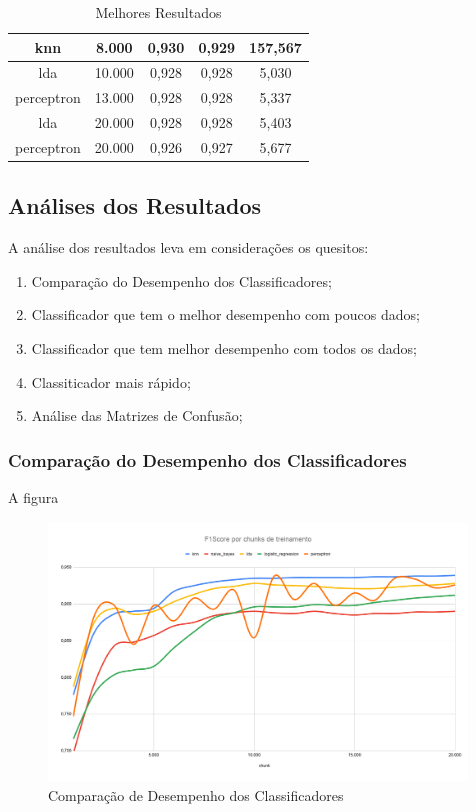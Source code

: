 \documentclass[12pt]{article}
\begin{document}
\begin{table}[!htb]
\begin{tabular}{|c|c|c|c|c|}
knn                 & 8.000          & 0,930            & 0,929             & 157,567                     \\ \hline
lda                 & 10.000         & 0,928            & 0,928             & 5,030                       \\ \hline
perceptron          & 13.000         & 0,928            & 0,928             & 5,337                       \\ \hline
lda                 & 20.000         & 0,928            & 0,928             & 5,403                       \\ \hline
perceptron          & 20.000         & 0,926            & 0,927             & 5,677                       \\ \hline
\end{tabular}
  \caption{Melhores Resultados}
  \label{tab:resultados_melhores}
\end{table}

\subsection{Análises dos Resultados}

A análise dos resultados leva em considerações os quesitos:

\begin{enumerate}
  \item Comparação do Desempenho dos Classificadores;
  \item Classificador que tem o melhor desempenho com poucos dados;
  \item Classificador que tem melhor desempenho com todos os dados;
  \item Classiticador mais rápido;
  \item Análise das Matrizes de Confusão;
\end{enumerate}

\subsubsection{Comparação do Desempenho dos Classificadores}

A figura 

\begin{figure}[!htb]
  \centering
  \includegraphics[width=30em]{images/image_comparacao_classificadores.png}
  \caption{Comparação de Desempenho dos Classificadores}
  \label{fig:comparacao_classificadores}
\end{figure}
\end{document}
